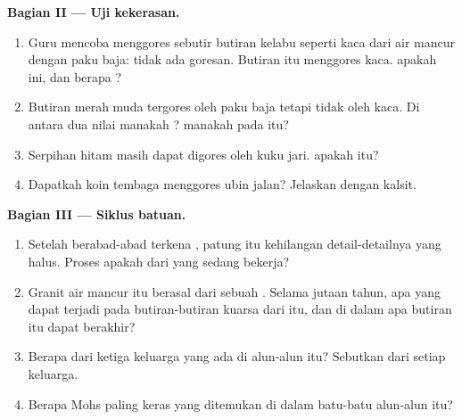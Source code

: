 \begin{problem}
\medskip
\noindent\textbf{Bagian II --- Uji kekerasan.}
\begin{enumerate}[resume]
  \item Guru mencoba menggores sebutir butiran kelabu seperti kaca dari air
        mancur dengan paku baja: tidak ada goresan. Butiran itu menggores
        kaca.  apakah ini, dan berapa ?
  \item Butiran merah muda tergores oleh paku baja tetapi tidak oleh kaca.
        Di antara dua nilai manakah ?  manakah pada
         itu?
  \item Serpihan hitam masih dapat digores oleh kuku jari.  apakah
        itu?
  \item Dapatkah koin tembaga menggores ubin jalan? Jelaskan dengan
         kalsit.
\end{enumerate}

\medskip
\noindent\textbf{Bagian III --- Siklus batuan.}
\begin{enumerate}[resume]
  \item Setelah berabad-abad terkena , patung itu kehilangan
        detail-detailnya yang halus. Proses apakah dari  yang
        sedang bekerja?
  \item Granit air mancur itu berasal dari sebuah . Selama jutaan
        tahun, apa yang dapat terjadi pada butiran-butiran kuarsa dari 
        itu, dan di dalam  apa butiran itu dapat berakhir?
  \item Berapa dari ketiga keluarga  yang ada di alun-alun itu?
        Sebutkan  dari setiap keluarga.
  \item Berapa  Mohs  paling keras yang ditemukan di dalam
        batu-batu alun-alun itu?
\end{enumerate}
\end{problem}

